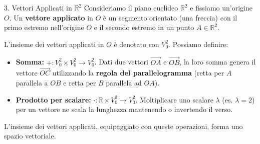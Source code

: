 \documentclass[11pt,a4paper]{article}
\begin{document}
\begin{example}{3. Vettori Applicati in $\mathbb{R}^2$}{}
Consideriamo il piano euclideo $\mathbb{R}^2$ e fissiamo un'origine $O$.
Un \textbf{vettore applicato} in $O$ è un segmento orientato (una freccia) con il primo estremo nell'origine $O$ e il secondo estremo in un punto $A \in \mathbb{R}^2$.

L'insieme dei vettori applicati in $O$ è denotato con $V_0^2$. Possiamo definire:
\begin{itemize}
    \item \textbf{Somma:} $+ : V_0^2 \times V_0^2 \longrightarrow V_0^2$. Dati due vettori $\vec{OA}$ e $\vec{OB}$, la loro somma genera il vettore $\vec{OC}$ utilizzando la \textbf{regola del parallelogramma} (retta per $A$ parallela a $OB$ e retta per $B$ parallela ad $OA$).
    \item \textbf{Prodotto per scalare:} $\cdot : \mathbb{R} \times V_0^2 \longrightarrow V_0^2$. Moltiplicare uno scalare $\lambda$ (es. $\lambda=2$) per un vettore ne scala la lunghezza mantenendo o invertendo il verso.
\end{itemize}
L'insieme dei vettori applicati, equipaggiato con queste operazioni, forma uno spazio vettoriale.

\begin{center}
\end{center}
\end{example}
\end{document}

